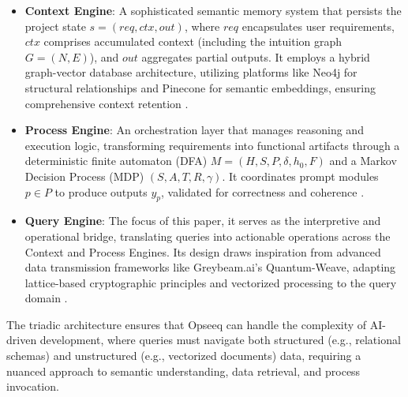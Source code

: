 \documentclass[11pt]{article}
\begin{document}
\begin{itemize}
    \item \textbf{Context Engine}: A sophisticated semantic memory system that persists the project state \( s = (req, ctx, out) \), where \( req \) encapsulates user requirements, \( ctx \) comprises accumulated context (including the intuition graph \( G = (N, E) \)), and \( out \) aggregates partial outputs. It employs a hybrid graph-vector database architecture, utilizing platforms like Neo4j for structural relationships and Pinecone for semantic embeddings, ensuring comprehensive context retention \cite{opseeq_research}.
    \item \textbf{Process Engine}: An orchestration layer that manages reasoning and execution logic, transforming requirements into functional artifacts through a deterministic finite automaton (DFA) \( M = (H, S, P, \delta, h_0, F) \) and a Markov Decision Process (MDP) \( (S, A, T, R, \gamma) \). It coordinates prompt modules \( p \in P \) to produce outputs \( y_p \), validated for correctness and coherence \cite{bellman1957}.
    \item \textbf{Query Engine}: The focus of this paper, it serves as the interpretive and operational bridge, translating queries into actionable operations across the Context and Process Engines. Its design draws inspiration from advanced data transmission frameworks like Greybeam.ai’s Quantum-Weave, adapting lattice-based cryptographic principles and vectorized processing to the query domain \cite{greybeam_quw}.
\end{itemize}

The triadic architecture ensures that Opseeq can handle the complexity of AI-driven development, where queries must navigate both structured (e.g., relational schemas) and unstructured (e.g., vectorized documents) data, requiring a nuanced approach to semantic understanding, data retrieval, and process invocation.
\end{document}
